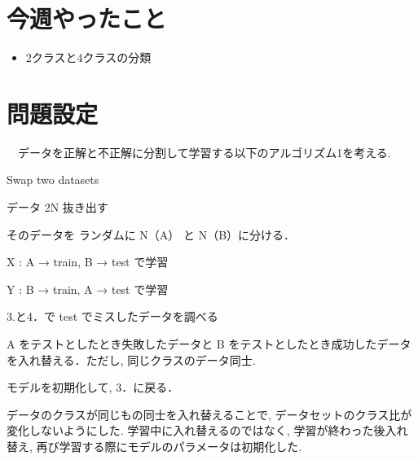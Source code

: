 \documentclass[twocolumn]{jarticle}     %
\begin{document}


\section{今週やったこと}
\begin{itemize}
	\item {2クラスと4クラスの分類}
\end{itemize}

\section{問題設定}

　データを正解と不正解に分割して学習する以下のアルゴリズム1を考える.

	\begin{algorithm}
		\caption{Swap two datasets}
		\label{alg1}
		\begin{enumerate}{ %
			\item{データ 2N 抜き出す}
			\item{そのデータを ランダムに N（A） と N（B）に分ける．}
			\item{X : A → train, B → test で学習}
			\item{Y : B → train, A → test で学習}
			\item{3.と4．で test でミスしたデータを調べる}
			\item{A をテストとしたとき失敗したデータと B をテストとしたとき成功したデータを入れ替える．ただし, 同じクラスのデータ同士.}
			\item{モデルを初期化して, 3．に戻る．}
		}\end{enumerate}
	\end{algorithm}

	データのクラスが同じもの同士を入れ替えることで, データセットのクラス比が変化しないようにした.
  学習中に入れ替えるのではなく, 学習が終わった後入れ替え, 再び学習する際にモデルのパラメータは初期化した.
\end{document}
